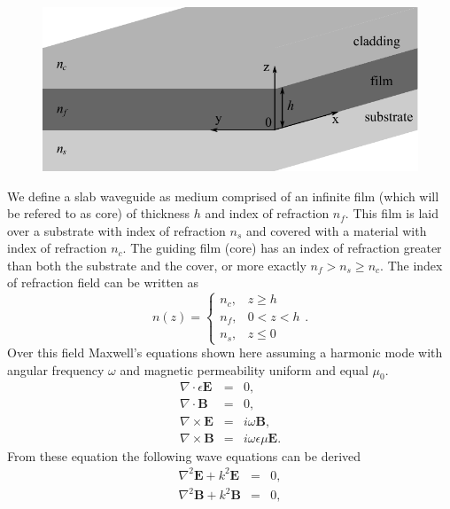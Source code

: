 \documentclass[12pt,twoside,english]{book}
\renewcommand{\~}{\perispomeni}%
\numberwithin{equation}{section}
\numberwithin{figure}{section}
\begin{document}
%
\begin{figure}[h]
\noindent \centering{}\includegraphics[scale=0.8]{figures/slab}\caption{}

\end{figure}
We define a slab waveguide as medium comprised of an infinite film (which will be refered to as core) of thickness $h$ and index of refraction $n_{f}$. This film is laid over a substrate with index of refraction $n_{s}$ and covered with a material with index of refraction $n_{c}$. The guiding film (core) has an index of refraction greater than both the substrate and the cover, or more exactly $n_{f}>n_{s}\ge n_{c}$. The index of refraction field can be written as
\begin{equation}
n\left(z\right)=\begin{cases}
n_{c}, & z\ge h\\
n_{f}, & 0<z<h\\
n_{s}, & z\le0\end{cases}.\label{eq:refractive index}\end{equation}
Over this field Maxwell's equations shown here assuming a harmonic mode with angular frequency $\omega$ and magnetic permeability uniform and equal $\mu_{0}$.
\begin{subequations}\begin{eqnarray}
\nabla\cdot\epsilon\mathbf{E} & = & 0,\label{eq:maxwell 1}\\
\nabla\cdot\mathbf{B} & = & 0,\label{eq:maxwell 2}\\
\nabla\times\mathbf{E} & = & i\omega\mathbf{B,}\label{eq:maxwell 3}\\
\nabla\times\mathbf{B} & = & i\omega\epsilon\mu\mathbf{E}.\label{eq:maxwell 4}\end{eqnarray}
\label{eq:maxwell}\end{subequations}
From these equation the following wave equations can be derived
\begin{subequations}\begin{eqnarray}
\nabla^{2}\mathbf{E}+k^{2}\mathbf{E} & = & 0,\label{eq:wave equation E}\\
\nabla^{2}\mathbf{B}+k^{2}\mathbf{B} & = & 0,\label{eq:wave equation B}\end{eqnarray}
\label{eq:wave equation}\end{subequations}
\end{document}
